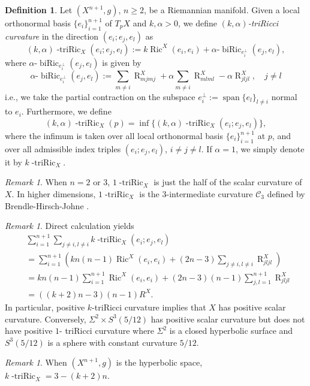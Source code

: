 \documentclass[11pt,letterpaper]{amsart}
\DeclareMathOperator{\Ric}{Ric}
\DeclareMathOperator{\biRic}{biRic}
\DeclareMathOperator{\R}{R}
\DeclareMathOperator{\vspan}{span}
\theoremstyle{definition}
\newtheorem{definition}[theorem]{Definition}
\theoremstyle{remark}
\newtheorem{remark}[theorem]{Remark}
\numberwithin{equation}{section}
\begin{document}
\begin{definition}\label{triRic}
    Let $(X^{n+1},g)$, $n\geq 2$, be a  Riemannian manifold. Given a local orthonormal basis $\{e_i\}_{i=1}^{n+1}$ of $T_pX$ and $k, \alpha>0$, we define \textit{$(k,\alpha)$-triRicci curvature} in the direction $(e_i;e_j,e_l)$ as
    \begin{equation}
        (k,\alpha)\operatorname{-triRic}_X(e_i;e_j,e_l):=k\Ric^X(e_i,e_i)+\alpha\text{-}
        \biRic_{e_i^{\perp}}(e_j,e_l),
    \end{equation}
    where $\alpha\text{-}\biRic_{e_i^{\perp}}(e_j,e_l)$ is given by
    \begin{equation*}
        \alpha\text{-}\biRic_{e_i^{\perp}}(e_j,e_l):=\sum_{m\neq i}\R^X_{mjmj}+\alpha\sum_{m\neq i}\R^X_{mlml}-\alpha\R^X_{jljl}, \quad j\neq l
    \end{equation*}
    i.e., we take the partial contraction on the subspace $e_i^{\perp}:=\vspan \{e_l\}_{l\neq i}$ normal to $e_i$. Furthermore, we define $$(k,\alpha)\operatorname{-triRic}_X(p)=\inf \{(k,\alpha)\operatorname{-triRic}_X(e_i;e_j,e_l)\},$$
    where the infimum is taken over all local orthonormal basis $\{e_i\}_{i=1}^{n+1}$ at $p$, and over all admissible index triples $(e_i;e_j,e_l)$, $i\neq j\neq l$.
    If $\alpha=1$, we simply denote it by $k\operatorname{-triRic}_X$.
\end{definition}

\begin{remark}
    When $n=2$ or $3$, $1\operatorname{-triRic}_X$ is just the half of the scalar curvature of $X$. In higher dimensions, $1\operatorname{-triRic}_X$ is the $3$-intermediate curvature $\mathcal{C}_3$ defined by Brendle-Hirsch-Johne \cite{brendlegeroch'sconjecture}.
\end{remark}
\begin{remark}\label{triRicandscalar}
    Direct calculation yields
    \begin{equation*}
    \begin{split}
        &\sum_{i=1}^{n+1}\sum_{j\neq i, l\neq i} k\operatorname{-triRic}_X(e_i;e_j,e_l)\\
        &=\sum_{i=1}^{n+1} \left(kn(n-1)\Ric^X(e_i,e_i)+(2n-3)\sum_{j\neq i, l\neq i}\R^X_{jljl}\right)\\
        &=kn(n-1)\sum_{i=1}^{n+1}\Ric^X(e_i,e_i)+(2n-3)(n-1)\sum_{j,l=1}^{n+1}\R^X_{jljl}\\
        &=((k+2)n-3)(n-1)R^X. 
        \end{split}
    \end{equation*}
In particular, positive $k$-triRicci curvature implies that $X$ has positive scalar curvature. Conversely, $\Sigma^2\times S^{3}(5/12)$ has positive scalar curvature but does not have positive $1$- triRicci curvature where $\Sigma^2$ is a closed hyperbolic surface and $S^3(5/12)$ is a sphere with constant curvature $5/12$.
\end{remark}
\begin{remark}
    When $(X^{n+1},g)$ is the hyperbolic space, $k\operatorname{-triRic}_X=3-(k+2)n.$
\end{remark}
\end{document}
